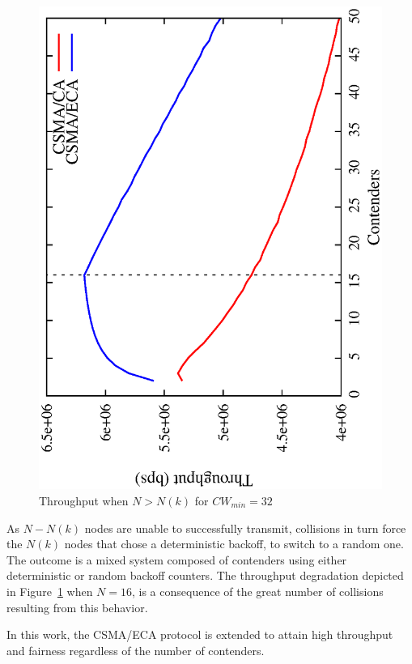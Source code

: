 \begin{figure}[htbp]
  \centering
  \includegraphics[width=0.7\linewidth, angle = -90]{figures/throughput/throughput.eps}
  \caption{Throughput when $N>N(k)$ for $CW_{min}=32$
  \label{fig:throughput}}
\end{figure}

As $N-N(k)$ nodes are unable to successfully transmit, collisions in turn force the $N(k)$ nodes that chose a deterministic backoff, to switch to a random one. The outcome is a mixed system composed of contenders using either deterministic or random backoff counters. The throughput degradation depicted in Figure~\ref{fig:throughput} when $N=16$, is a consequence of the great number of collisions resulting from this behavior.


In this work, the CSMA/ECA protocol is extended to attain high throughput and fairness regardless of the number of contenders.

